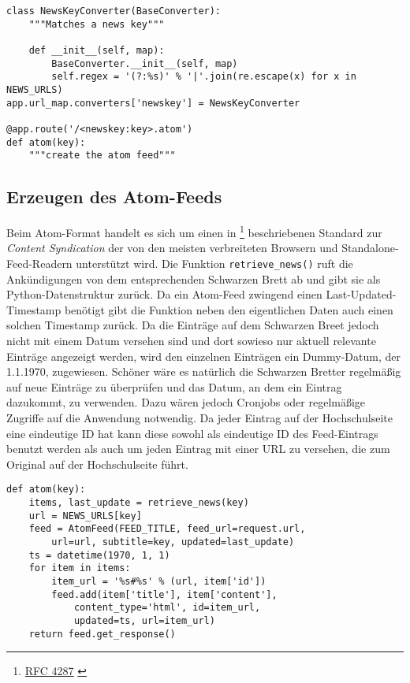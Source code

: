 \begin{lstlisting}[caption=HSKAtom - Routing,label=lst:hskatom-route-atom]
class NewsKeyConverter(BaseConverter):
    """Matches a news key"""

    def __init__(self, map):
        BaseConverter.__init__(self, map)
        self.regex = '(?:%s)' % '|'.join(re.escape(x) for x in NEWS_URLS)
app.url_map.converters['newskey'] = NewsKeyConverter

@app.route('/<newskey:key>.atom')
def atom(key):
    """create the atom feed"""
\end{lstlisting}

\subsection{Erzeugen des Atom-Feeds}

Beim Atom-Format handelt es sich um einen in \footnote{\href{http://www.ietf.org/rfc/rfc4287}{RFC
4287} \citep{rfc4287}} beschriebenen Standard zur \emph{Content Syndication} der von den meisten verbreiteten
Browsern und Standalone-Feed-Readern unterstützt wird. Die Funktion \lstinline{retrieve_news()} ruft
die Ankündigungen von dem entsprechenden Schwarzen Brett ab und gibt sie als Python-Datenstruktur
zurück. Da ein Atom-Feed zwingend einen Last-Updated-Timestamp benötigt gibt die Funktion neben den
eigentlichen Daten auch einen solchen Timestamp zurück. Da die Einträge auf dem Schwarzen Breet
jedoch nicht mit einem Datum versehen sind und dort sowieso nur aktuell relevante Einträge angezeigt
werden, wird den einzelnen Einträgen ein Dummy-Datum, der 1.1.1970, zugewiesen. Schöner wäre es
natürlich die Schwarzen Bretter regelmäßig auf neue Einträge zu überprüfen und das Datum, an dem ein
Eintrag dazukommt, zu verwenden. Dazu wären jedoch Cronjobs oder regelmäßige Zugriffe auf die
Anwendung notwendig. Da jeder Eintrag auf der Hochschulseite eine eindeutige ID hat kann diese
sowohl als eindeutige ID des Feed-Eintrags benutzt werden als auch um jeden Eintrag mit einer URL zu
versehen, die zum Original auf der Hochschulseite führt.

\begin{lstlisting}[caption=HSKAtom - Atom-Feed,label=lst:hskatom-atom]
def atom(key):
    items, last_update = retrieve_news(key)
    url = NEWS_URLS[key]
    feed = AtomFeed(FEED_TITLE, feed_url=request.url,
        url=url, subtitle=key, updated=last_update)
    ts = datetime(1970, 1, 1)
    for item in items:
        item_url = '%s#%s' % (url, item['id'])
        feed.add(item['title'], item['content'],
            content_type='html', id=item_url,
            updated=ts, url=item_url)
    return feed.get_response()
\end{lstlisting}

